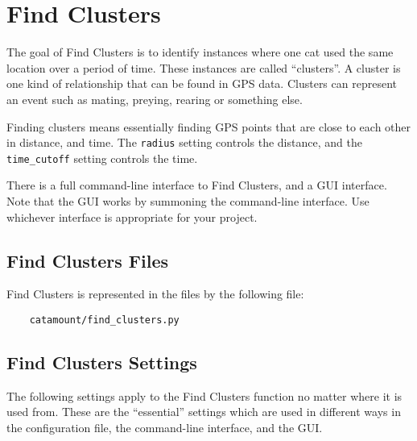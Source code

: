 \chapter{Find Clusters}
\hypertarget{find-clusters}{}

The goal of Find Clusters is to identify instances where one cat used
the same location over a period of time. These instances are called
``clusters''. A cluster is one kind of relationship that can be found
in GPS data. Clusters can represent an event such as mating, preying,
rearing or something else.

Finding clusters means essentially finding GPS points that are close
to each other in distance, and time. The \verb=radius= setting
controls the distance, and the \verb=time_cutoff= setting controls the
time.

There is a full command-line interface to Find Clusters, and a GUI
interface. Note that the GUI works by summoning the command-line
interface. Use whichever interface is appropriate for your project.

\section{Find Clusters Files}

Find Clusters is represented in the files by the following file:

\begin{verbatim}
    catamount/find_clusters.py
\end{verbatim}

\section{Find Clusters Settings}
\hypertarget{cluster-settings}{}

The following settings apply to the Find Clusters function no matter
where it is used from. These are the ``essential'' settings which are
used in different ways in the configuration file, the command-line
interface, and the GUI.


